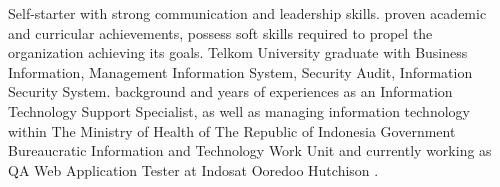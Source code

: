%
%
%
\par{
Self-starter with strong communication and leadership skills. proven academic and curricular achievements, possess soft skills required to propel the organization achieving its goals. Telkom University graduate with Business Information, Management Information System, Security Audit, Information Security System. background and years of experiences as an Information Technology Support Specialist, as well as managing information technology within The Ministry of Health of The Republic of Indonesia Government Bureaucratic Information and Technology Work Unit and currently working as QA Web Application Tester at Indosat Ooredoo Hutchison .
}
